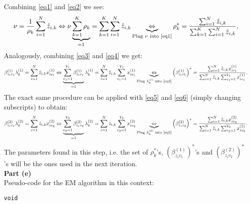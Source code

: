 \documentclass[a4paper, 11pt]{article}
\begin{document}
Combining \eqref{eq1} and \eqref{eq2} we see:
\begin{eqnarray}
\nu = \frac{1}{\rho_k} \sum_{i=1}^{N} \hat{z}_{i,k} \Leftrightarrow \nu \underbrace{\sum_{k=1}^{K} \rho_k}_{=1} = \sum_{k=1}^{K} \sum_{i=1}^{N} \hat{z}_{i,k} \underbrace{\Leftrightarrow}_{\text{Plug $\nu$ into \eqref{eq1}}} \rho_k^{*} =  \frac{\sum_{i=1}^N \hat{z}_{i,k}}{\sum_{k=1}^{K} \sum_{i=1}^{N} \hat{z}_{i,k}}, \nonumber
\end{eqnarray}
Analogously, combining \eqref{eq3} and \eqref{eq4} we get:
\begin{eqnarray}
\beta_{z_i v_1}^{(1)} \lambda_k^{(1)} = \sum_{i=1}^{N} \hat{z}_{i,k} x_{i v_1}^{(1)} \Leftrightarrow \underbrace{\sum_{v_1=1}^{V_1} \beta_{z_i v_1}^{(1)}}_{=1} \lambda_k^{(1)} = \sum_{i=1}^{N} \hat{z}_{i,k} \sum_{v_1=1}^{V_1} x_{i v_1}^{(1)} \underbrace{\Leftrightarrow}_{\text{Plug $\lambda_k^{(1)}$ into \eqref{eq3}}} \left(\beta_{z_i v_1}^{(1)}\right)^{*} = \frac{\sum_{i=1}^{N} \hat{z}_{i,k} x_{i v_1}^{(1)}}{\sum_{i=1}^{N} \hat{z}_{i,k} \sum_{v_1=1}^{V_1} x_{i v_1}^{(1)}}.  \nonumber
\end{eqnarray}
The exact same procedure can be applied with \eqref{eq5} and \eqref{eq6} (simply changing subscripts) to obtain:
\begin{eqnarray}
\beta_{z_i v_1}^{(2)} \lambda_k^{(2)} = \sum_{i=1}^{N} \hat{z}_{i,k} x_{i v_2}^{(2)} \Leftrightarrow \underbrace{\sum_{v_2=1}^{V_2} \beta_{z_i v_2}^{(2)}}_{=1} \lambda_k^{(2)} = \sum_{i=1}^{N} \hat{z}_{i,k} \sum_{v_2=1}^{V_2} x_{i v_2}^{(2)} \underbrace{\Leftrightarrow}_{\text{Plug $\lambda_k^{(2)}$ into \eqref{eq5}}} \left(\beta_{z_i v_2}^{(2)} \right)^{*} = \frac{\sum_{i=1}^{N} \hat{z}_{i,k} x_{i v_2}^{(2)}}{\sum_{i=1}^{N} \hat{z}_{i,k} \sum_{v_2=1}^{V_2} x_{i v_2}^{(2)}}.  \nonumber
\end{eqnarray}
The parameters found in this step, i.e. the set of $\rho_k^{*}$'s, $\left(\beta_{z_i v_1}^{(1)} \right)^{*}$'s and $\left(\beta_{z_i v_2}^{(2)} \right)^{*}$'s will be the ones used in the next iteration.\\
\newline \textbf{Part (e)}\\
\newline Pseudo-code for the EM algorithm in this context:
\begin{verbatim}
void
\end{verbatim}
\end{document}
